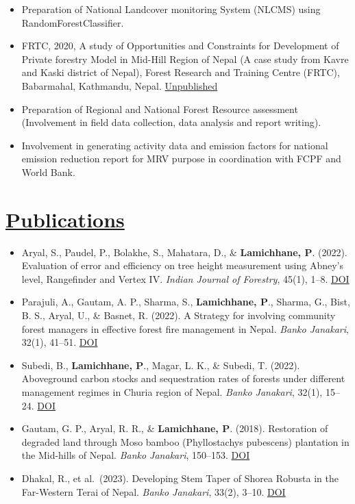 \documentclass[
]{article}
\begin{document}
\begin{itemize}
\item
  Preparation of National Landcover monitoring System (NLCMS) using
  RandomForestClassifier.
\item
  FRTC, 2020, A study of Opportunities and Constraints for Development
  of Private forestry Model in Mid-Hill Region of Nepal (A case study
  from Kavre and Kaski district of Nepal), Forest Research and Training
  Centre (FRTC), Babarmahal, Kathmandu, Nepal.
  \href{https://frtc.gov.np/uploads/files/Private\%20forest\%20Model(1).pdf}{Unpublished}
\item
  Preparation of Regional and National Forest Resource assessment
  (Involvement in field data collection, data analysis and report
  writing).
\item
  Involvement in generating activity data and emission factors for
  national emission reduction report for MRV purpose in coordination
  with FCPF and World Bank.
\end{itemize}

\section{\texorpdfstring{\underline{Publications}}{}}\label{section-3}

\begin{itemize}
\item
  Aryal, S., Paudel, P., Bolakhe, S., Mahatara, D., \&
  \textbf{Lamichhane, P}. (2022). Evaluation of error and efficiency on
  tree height measurement using Abney's level, Rangefinder and Vertex
  IV. \emph{Indian Journal of Forestry}, 45(1), 1--8.
  \href{https://doi.org/10.54207/bsmps1000-2022-49P4F8}{DOI}
\item
  Parajuli, A., Gautam, A. P., Sharma, S., \textbf{Lamichhane, P}.,
  Sharma, G., Bist, B. S., Aryal, U., \& Basnet, R. (2022). A Strategy
  for involving community forest managers in effective forest fire
  management in Nepal. \emph{Banko Janakari}, 32(1), 41--51.
  \href{https://doi.org/10.3126/banko.v32i1.45476}{DOI}
\item
  Subedi, B., \textbf{Lamichhane, P}., Magar, L. K., \& Subedi, T.
  (2022). Aboveground carbon stocks and sequestration rates of forests
  under different management regimes in Churia region of Nepal.
  \emph{Banko Janakari}, 32(1), 15--24.
  \href{https://doi.org/10.3126/banko.v32i1.45442}{DOI}
\item
  Gautam, G. P., Aryal, R. R., \& \textbf{Lamichhane, P}. (2018).
  Restoration of degraded land through Moso bamboo (Phyllostachys
  pubescens) plantation in the Mid-hills of Nepal. \emph{Banko
  Janakari}, 150--153.
  \href{https://doi.org/10.3126/banko.v27i3.20560}{DOI}
\item
  Dhakal, R., et al.~(2023). Developing Stem Taper of Shorea Robusta in
  the Far-Western Terai of Nepal. \emph{Banko Janakari}, 33(2), 3--10.
  \href{https://doi.org/10.3126/banko.v33i2.58809}{DOI}
\end{itemize}
\end{document}
